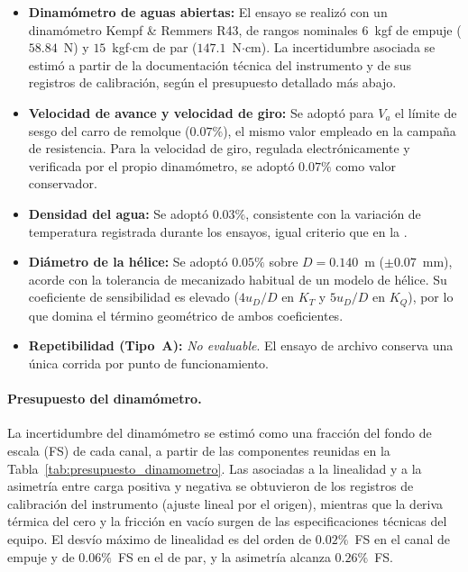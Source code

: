 \begin{itemize}
    \item \textbf{Dinamómetro de aguas abiertas:} El ensayo se realizó con un dinamómetro Kempf \& Remmers R43, de rangos nominales $6$~kgf de empuje ($58.84$~N) y $15$~kgf$\cdot$cm de par ($147.1$~N$\cdot$cm). La incertidumbre asociada se estimó a partir de la documentación técnica del instrumento y de sus registros de calibración, según el presupuesto detallado más abajo.

    \item \textbf{Velocidad de avance y velocidad de giro:} Se adoptó para $V_a$ el límite de sesgo del carro de remolque ($0.07\%$), el mismo valor empleado en la campaña de resistencia. Para la velocidad de giro, regulada electrónicamente y verificada por el propio dinamómetro, se adoptó $0.07\%$ como valor conservador.

    \item \textbf{Densidad del agua:} Se adoptó $0.03\%$, consistente con la variación de temperatura registrada durante los ensayos, igual criterio que en la .

    \item \textbf{Diámetro de la hélice:} Se adoptó $0.05\%$ sobre $D = 0.140$~m ($\pm 0.07$~mm), acorde con la tolerancia de mecanizado habitual de un modelo de hélice. Su coeficiente de sensibilidad es elevado ($4u_D/D$ en $K_T$ y $5u_D/D$ en $K_Q$), por lo que domina el término geométrico de ambos coeficientes.

    \item \textbf{Repetibilidad (Tipo~A):} \emph{No evaluable}. El ensayo de archivo conserva una única corrida por punto de funcionamiento.
\end{itemize}

\paragraph{Presupuesto del dinamómetro.}

La incertidumbre del dinamómetro se estimó como una fracción del fondo de escala (FS) de cada canal, a partir de las componentes reunidas en la Tabla~\ref{tab:presupuesto_dinamometro}. Las asociadas a la linealidad y a la asimetría entre carga positiva y negativa se obtuvieron de los registros de calibración del instrumento (ajuste lineal por el origen), mientras que la deriva térmica del cero y la fricción en vacío surgen de las especificaciones técnicas del equipo. El desvío máximo de linealidad es del orden de $0.02\%$~FS en el canal de empuje y de $0.06\%$~FS en el de par, y la asimetría alcanza $0.26\%$~FS.

